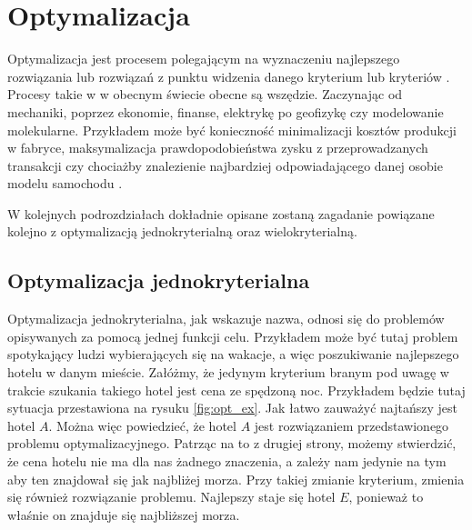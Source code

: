 \documentclass[twoside]{iisthesis}
\begin{document}
\chapter{Optymalizacja}
Optymalizacja jest procesem polegającym na wyznaczeniu najlepszego rozwiązania lub rozwiązań z punktu widzenia danego kryterium lub kryteriów \cite{wiki_optimization}. Procesy takie w w obecnym świecie obecne są wszędzie. Zaczynając od mechaniki, poprzez ekonomie, finanse, elektrykę po geofizykę czy modelowanie molekularne. Przykładem może być konieczność minimalizacji kosztów produkcji w fabryce, maksymalizacja prawdopodobieństwa zysku z przeprowadzanych transakcji czy chociażby znalezienie najbardziej odpowiadającego danej osobie modelu samochodu \cite{wiki_pl_optimization}.

W kolejnych podrozdziałach dokładnie opisane zostaną zagadanie powiązane kolejno z optymalizacją jednokryterialną oraz wielokryterialną.
\section{Optymalizacja jednokryterialna}
Optymalizacja jednokryterialna, jak wskazuje nazwa, odnosi się do problemów opisywanych za pomocą jednej funkcji celu. Przykładem może być tutaj problem spotykający ludzi wybierających się na wakacje, a więc poszukiwanie najlepszego hotelu w danym mieście. Załóżmy, że jedynym kryterium branym pod uwagę w trakcie szukania takiego hotel jest cena ze spędzoną noc. Przykładem będzie tutaj sytuacja przestawiona na rysuku \eqref{fig:opt_ex}. Jak łatwo zauważyć najtańszy jest hotel $A$. Można więc powiedzieć, że hotel $A$ jest rozwiązaniem przedstawionego problemu optymalizacyjnego. Patrząc na to z drugiej strony, możemy stwierdzić, że cena hotelu nie ma dla nas żadnego znaczenia, a zależy nam jedynie na tym aby ten znajdował się jak najbliżej morza. Przy takiej zmianie kryterium, zmienia się również rozwiązanie problemu. Najlepszy staje się hotel $E$, ponieważ to właśnie on znajduje się najbliższej morza.
\end{document}
